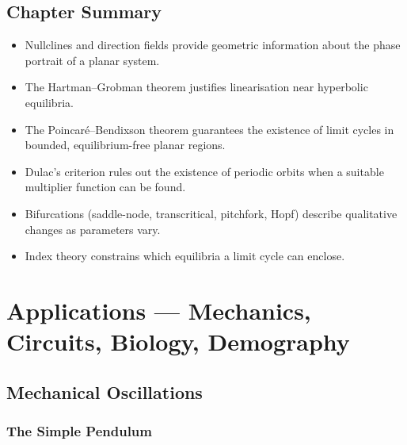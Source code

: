 \documentclass[12pt,a4paper,openany]{book}
\theoremstyle{definition}
\theoremstyle{plain}
\theoremstyle{remark}
\begin{document}
\section*{Chapter Summary}

\begin{itemize}
  \item Nullclines and direction fields provide geometric information
    about the phase portrait of a planar system.
  \item The Hartman--Grobman theorem justifies linearisation near
    hyperbolic equilibria.
  \item The Poincar\'e--Bendixson theorem guarantees the existence of
    limit cycles in bounded, equilibrium-free planar regions.
  \item Dulac's criterion rules out the existence of periodic orbits
    when a suitable multiplier function can be found.
  \item Bifurcations (saddle-node, transcritical, pitchfork, Hopf)
    describe qualitative changes as parameters vary.
  \item Index theory constrains which equilibria a limit cycle can
    enclose.
\end{itemize}


\chapter{Applications --- Mechanics, Circuits, Biology, Demography}
\label{ch:applications}

\section{Mechanical Oscillations}
\label{sec:mechanics}

\subsection{The Simple Pendulum}
\label{subsec:pendulum}
\end{document}
